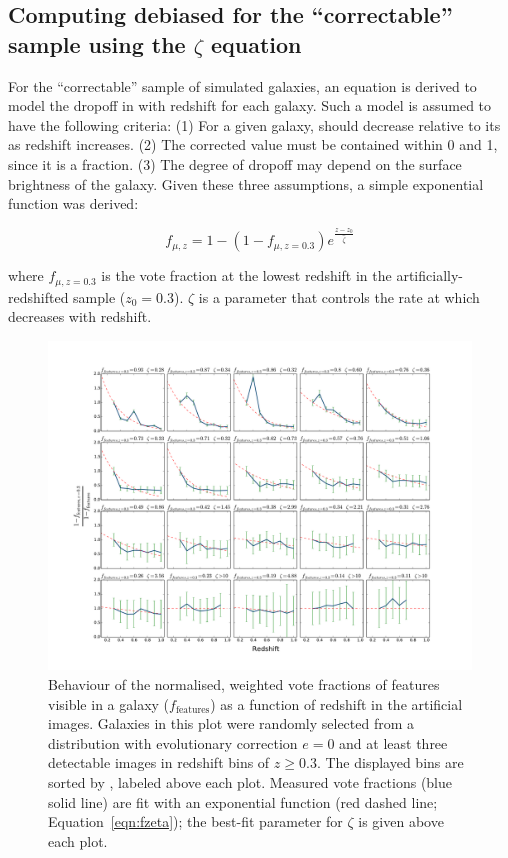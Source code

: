 \subsection{Computing debiased \ffeatures{} for the ``correctable'' sample using the $\zeta$ equation}

For the ``correctable'' sample of simulated \ferengi{} galaxies, an equation is derived to model the dropoff in \ffeatures{} with redshift for each galaxy. Such a model is assumed to have the following criteria: (1) For a given galaxy, \ffeatures{} should decrease relative to its \ffeaturesrest{} as redshift increases. (2) The corrected \ffeatures{} value must be contained within 0 and 1, since it is a fraction. (3) The degree of dropoff may depend on the surface brightness of the galaxy. Given these three assumptions, a simple exponential function was derived:

\begin{equation}
f_{\mu,z} = 1 - (1 - f_{\mu,z=0.3})e^{\frac{z-z_0}{\hat\zeta}}
\label{eqn:fzeta}
\end{equation}

where $f_{\mu,z=0.3}$ is the vote fraction at the lowest redshift in the artificially-redshifted \ferengi{} sample ($z_{0}=0.3$). $\zeta$ is a parameter that controls the rate at which \ffeatures decreases with redshift. 

\begin{figure}
\center
\includegraphics[width=\textwidth]{figures/zeta_examples_sorted.pdf}
\caption{Behaviour of the normalised, weighted vote fractions of features
visible in a galaxy ($f_\textrm{features}$) as a function of redshift in the
artificial \ferengi{} images. Galaxies in this plot were randomly selected from
a distribution with evolutionary correction $e=0$ and at least three detectable images 
in redshift bins of $z\ge0.3$. The displayed bins are sorted by \ffeaturesrest, 
labeled above each plot. Measured vote fractions (blue
solid line) are fit with an exponential function (red dashed line;
Equation~\ref{eqn:fzeta}); the best-fit parameter for $\zeta$ is given above
each plot.}


\label{fig:zeta_examples}
\end{figure}



